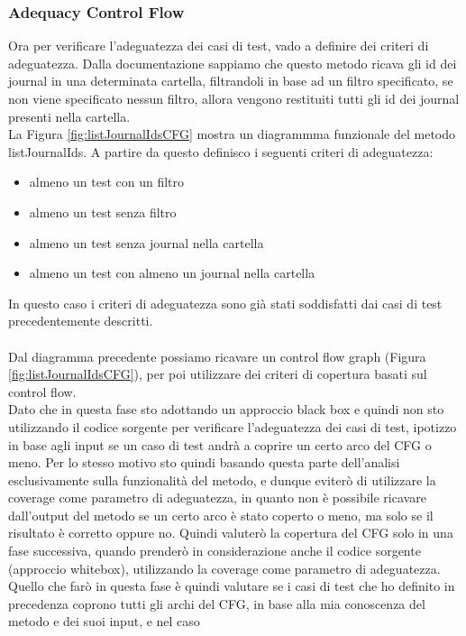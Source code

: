 \documentclass[12pt, a4paper]{article}
\begin{document}
\subsubsection{Adequacy Control Flow}
Ora per verificare l'adeguatezza dei casi di test, vado a definire dei criteri di adeguatezza. 
Dalla documentazione sappiamo che questo metodo ricava gli id dei journal in una 
determinata cartella, filtrandoli in base ad un filtro specificato, se non viene specificato 
nessun filtro, allora vengono restituiti tutti gli id dei journal presenti nella cartella. \\
La Figura \ref{fig:listJournalIdsCFG} mostra un diagrammma 
funzionale del metodo listJournalIds.
A partire da questo definisco i seguenti criteri di adeguatezza:
\begin{itemize}
  \item almeno un test con un filtro
  \item almeno un test senza filtro
  \item almeno un test senza journal nella cartella
  \item almeno un test con almeno un journal nella cartella
\end{itemize}
In questo caso i criteri di adeguatezza sono già stati soddisfatti 
dai casi di test precedentemente descritti. \\ \\
Dal diagramma precedente possiamo 
ricavare un control flow graph (Figura \ref{fig:listJournalIdsCFG}), per poi
utilizzare dei criteri di copertura basati sul control flow. \\
Dato che in questa fase sto adottando un approccio black box e quindi non sto utilizzando il codice sorgente
per verificare l'adeguatezza dei casi di test, ipotizzo in base agli input se un caso di test andrà a coprire
un certo arco del CFG o meno. Per lo stesso motivo sto quindi basando questa parte dell'analisi esclusivamente sulla funzionalità del metodo, 
e dunque eviterò di utilizzare la coverage come parametro di adeguatezza, in quanto non è possibile ricavare
dall'output del metodo se un certo arco è stato coperto o meno, ma solo se il risultato è corretto oppure no.
Quindi valuterò la copertura del CFG solo in una fase successiva, quando prenderò in considerazione
anche il codice sorgente (approccio whitebox), utilizzando la coverage come parametro di adeguatezza.
Quello che farò in questa fase è quindi valutare se i casi di test che ho definito in precedenza
coprono tutti gli archi del CFG, in base alla mia conoscenza del metodo e dei suoi input, e nel caso
\end{document}
